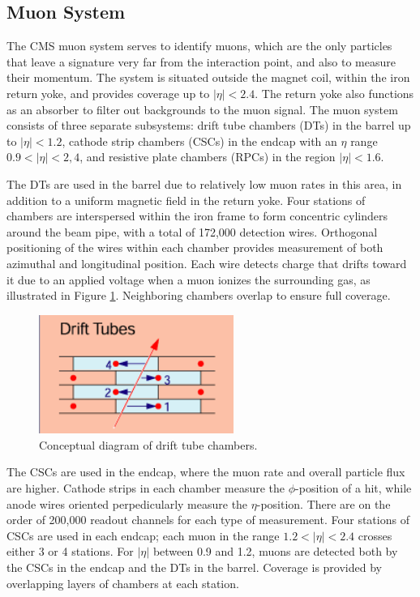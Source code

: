 \subsection{Muon System}
\label{exp:muons}
The CMS muon system serves to identify muons, 
which are the only particles that leave a signature 
very far from the interaction point,
and also to measure their momentum.  
The system is situated outside the magnet coil, 
within the iron return yoke, 
and provides coverage up to $|\eta| < 2.4$.  
The return yoke also functions as an absorber 
to filter out backgrounds to the muon signal.  
The muon system consists of three separate subsystems: 
drift tube chambers (DTs) in the barrel up to $|\eta| < 1.2$, 
cathode strip chambers (CSCs) in the endcap 
with an $\eta$ range $ 0.9 < |\eta| < 2,4$, 
and resistive plate chambers (RPCs) %
in the region $ |\eta| < 1.6$.  

The DTs are used in the barrel due to 
relatively low muon rates in this area, 
in addition to a uniform magnetic field in the 
return yoke.  
Four stations of chambers are interspersed 
within the iron frame to form %
concentric cylinders around the beam pipe, 
with a total of 
172,000 detection wires.  
Orthogonal positioning of the wires 
within each chamber provides measurement of 
both azimuthal and longitudinal position.  
Each wire detects charge that drifts toward it 
due to an applied voltage when a muon ionizes 
the surrounding gas, as illustrated in 
Figure \ref{fig:DTconcept}.  
Neighboring chambers overlap 
to ensure full coverage.  

 \begin{figure}[htb]
  \begin{center}
    \includegraphics[width=180pt]{Figures/muon-DT-concept.png}
  \end{center}
  \caption[\fixspacing Conceptual diagram of drift tube chambers]
	  {\fixspacing Conceptual diagram of drift tube chambers.}
  \label{fig:DTconcept}
 \end{figure}

The CSCs are used in the endcap, 
where the muon rate and overall particle flux 
are higher.  
Cathode strips in each chamber 
measure the $\phi$-position of a hit, 
while anode wires oriented perpedicularly measure 
the $\eta$-position.  
There are on the order of 200,000 readout channels 
for each type of measurement.  
Four stations of CSCs are used in each endcap; 
each muon in the range $1.2 < |\eta| <2.4$ crosses either 
3 or 4 stations.  
For $|\eta|$ between 0.9 and 1.2, muons are detected 
both by the CSCs in the endcap and the DTs in the barrel.  
Coverage is provided by overlapping layers of chambers 
at each station.  

